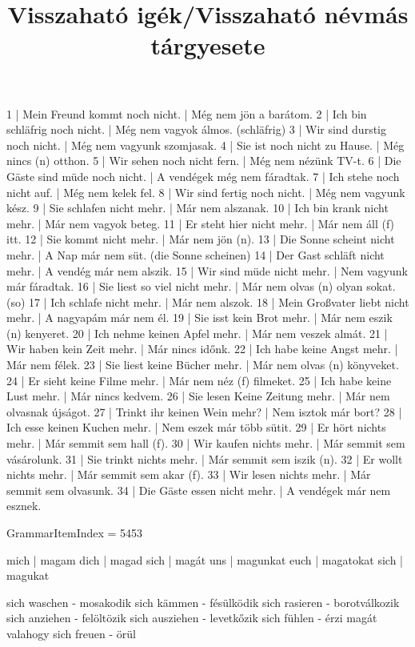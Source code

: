 \begin{exmp}
1 | Mein Freund kommt noch nicht. | Még nem jön a barátom.
2 | Ich bin schläfrig noch nicht. | Még nem vagyok álmos. (schläfrig)
3 | Wir sind durstig noch nicht. | Még nem vagyunk szomjasak.
4 | Sie ist noch nicht zu Hause. | Még nincs (n) otthon.
5 | Wir sehen noch nicht fern. | Még nem nézünk TV-t.
6 | Die Gäste sind müde noch nicht. | A vendégek még nem fáradtak.
7 | Ich stehe noch nicht auf. | Még nem kelek fel.
8 | Wir sind fertig noch nicht. | Még nem vagyunk kész.
9 | Sie schlafen nicht mehr. | Már nem alszanak.
10 | Ich bin krank nicht mehr. | Már nem vagyok beteg.
11 | Er steht hier nicht mehr. | Már nem áll (f) itt.
12 | Sie kommt nicht mehr. | Már nem jön (n).
13 | Die Sonne scheint nicht mehr. | A Nap már nem süt. (die Sonne scheinen)
14 | Der Gast schläft nicht mehr. | A vendég már nem alszik.
15 | Wir sind müde nicht mehr. | Nem vagyunk már fáradtak.
16 | Sie liest so viel nicht mehr. | Már nem olvas (n) olyan sokat. (so)
17 | Ich schlafe nicht mehr. | Már nem alszok.
18 | Mein Großvater liebt nicht mehr. | A nagyapám már nem él.
19 | Sie isst kein Brot mehr. | Már nem eszik (n) kenyeret.
20 | Ich nehme keinen Apfel mehr. | Már nem veszek almát.
21 | Wir haben kein Zeit mehr. | Már nincs időnk.
22 | Ich habe keine Angst mehr. | Már nem félek.
23 | Sie liest keine Bücher mehr. | Már nem olvas (n) könyveket.
24 | Er sieht keine Filme mehr. | Már nem néz (f) filmeket.
25 | Ich habe keine Lust mehr. | Már nincs kedvem.
26 | Sie lesen Keine Zeitung mehr. | Már nem olvasnak újságot.
27 | Trinkt ihr keinen Wein mehr? | Nem isztok már bort?
28 | Ich esse keinen Kuchen mehr. | Nem eszek már több sütit.
29 | Er hört nichts mehr. | Már semmit sem hall (f).
30 | Wir kaufen nichts mehr. | Már semmit sem vásárolunk.
31 | Sie trinkt nichts mehr. | Már semmit sem iszik (n).
32 | Er wollt nichts mehr. | Már semmit sem akar (f).
33 | Wir lesen nichts mehr. | Már semmit sem olvasunk.
34 | Die Gäste essen nicht mehr. | A vendégek már nem esznek.
\end{exmp}

\title{Visszaható igék/Visszaható névmás tárgyesete}

GrammarItemIndex = 5453

\begin{desc}
mich | magam 
dich | magad 
sich | magát 
uns  | magunkat 
euch | magatokat 
sich | magukat 

sich waschen - mosakodik
sich kämmen - fésülködik
sich rasieren - borotválkozik
sich anziehen - felöltözik
sich ausziehen - levetkőzik
sich fühlen - érzi magát valahogy
sich freuen - örül
\end{desc}

